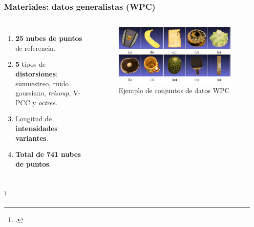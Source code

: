 \begin{frame}
    \frametitle{Materiales: datos generalistas (WPC)}
    \begin{columns}
      \begin{enumerate}
        \item \textbf{25 nubes de puntos} de referencia.  
        \item \textbf{5} tipos de \textbf{distorsiones}: 
          sumuestreo, ruido gaussiano, \emph{trisoup}, V-PCC y \emph{octree}.
        \item Longitud de \textbf{intensidades variantes}.
        \item \textbf{Total de 741 nubes de puntos}.
      \end{enumerate}
      \begin{figure}
        \includegraphics[width=.95\textwidth]{imagenes/chapter3/WPC}
        \caption{Ejemplo de conjuntos de datos WPC\footnotemark}
        \label{fig:WPC}
      \end{figure}
    \end{columns}
    \footcitetext{WPC1}
\end{frame}

